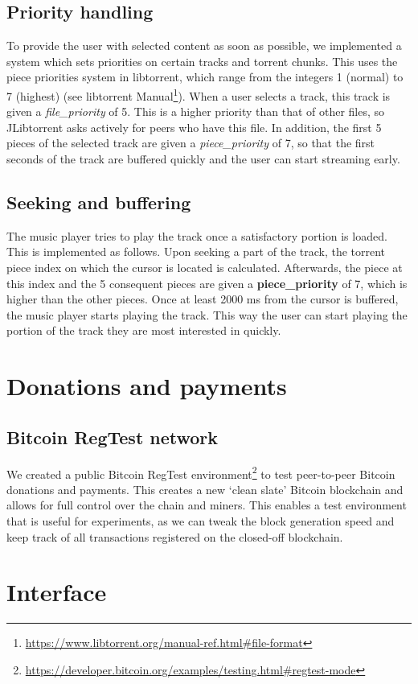 \subsection{Priority handling}
To provide the user with selected content as soon as possible, we implemented a system which sets priorities on certain tracks and torrent chunks. This uses the piece priorities system in libtorrent, which range from the integers 1 (normal) to 7 (highest) (see libtorrent Manual\footnote{\url{https://www.libtorrent.org/manual-ref.html\#file-format}}). When a user selects a track, this track is given a \textit{file\_priority} of 5. This is a higher priority than that of other files, so JLibtorrent asks actively for peers who have this file. In addition, the first 5  pieces of the selected track are given a \textit{piece\_priority} of 7, so that the first seconds of the track are buffered quickly and the user can start streaming early.
\subsection{Seeking and buffering}
The music player tries to play the track once a satisfactory portion is loaded. This is implemented as follows. Upon seeking a part of the track, the torrent piece index on which the cursor is located is calculated. Afterwards, the piece at this index and the 5 consequent pieces are given a \textbf{piece\_priority} of 7, which is higher than the other pieces. Once at least 2000 ms from the cursor is buffered, the music player starts playing the track. This way the user can start playing the portion of the track they are most interested in quickly.
\section{Donations and payments}
\subsection{Bitcoin RegTest network}
We created a public Bitcoin RegTest environment\footnote{\url{https://developer.bitcoin.org/examples/testing.html\#regtest-mode}} to test peer-to-peer Bitcoin donations and payments. This creates a new `clean slate' Bitcoin blockchain and allows for full control over the chain and miners. This enables a test environment that is useful for experiments, as we can tweak the block generation speed and keep track of all transactions registered on the closed-off blockchain.
\label{sec:regtest-network-impl}
\section{Interface}
